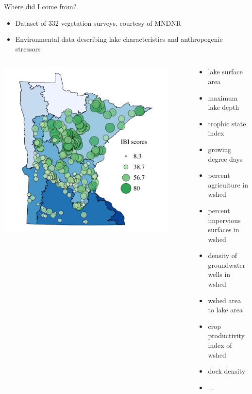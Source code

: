 \documentclass[serif]{beamer}\usepackage[]{graphicx}\usepackage[]{color}
\begin{document}
\begin{frame}{Where did I come from?}{}
\begin{itemize}
\item Dataset of 332 vegetation surveys, courtesy of MNDNR {\footnotesize \cite{Beck13,Beck14a}}
\item Environmental data describing lake characteristics and anthropogenic stressors
\end{itemize}
\begin{columns}
\begin{column}{0.5\textwidth}
\centerline{\includegraphics[width=0.9\textwidth]{fig/Beck_GEDsem-ibi_data.pdf}}
\end{column}
\begin{column}{0.5\textwidth}
\scriptsize
\begin{itemize}
\item{lake surface area}
\item{maximum lake depth}
\item{trophic state index}
\item{growing degree days}
\item{percent agriculture in wshed}
\item{percent impervious surfaces in wshed}
\item{density of groundwater wells in wshed}
\item{wshed area to lake area}
\item{crop productivity index of wshed}
\item{dock density}
\item{...}
\end{itemize}
\end{column}
\end{columns}
\end{frame}
\end{document}
